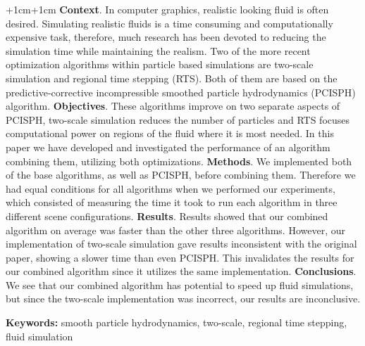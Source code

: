 \documentclass[a4paper,oneside]{bth}
\begin{document}
\abstract
\begin{changemargin}{+1cm}{+1cm}
\noindent
\textbf{Context}. In computer graphics, realistic looking fluid is often desired. Simulating realistic fluids is a time consuming and computationally expensive task, therefore, much research has been devoted to reducing the simulation time while maintaining the realism. Two of the more recent optimization algorithms within particle based simulations are two-scale simulation and regional time stepping (RTS). Both of them are based on the predictive-corrective incompressible smoothed particle hydrodynamics (PCISPH) algorithm. \newline
\textbf{Objectives}. These algorithms improve on two separate aspects of PCISPH, two-scale simulation reduces the number of particles and RTS focuses computational power on regions of the fluid where it is most needed. In this paper we have developed and investigated the performance of an algorithm combining them, utilizing both optimizations. \newline
\textbf{Methods}. We implemented both of the base algorithms, as well as PCISPH, before combining them. Therefore we had equal conditions for all algorithms when we performed our experiments, which consisted of measuring the time it took to run each algorithm in three different scene configurations.  \newline
\textbf{Results}. Results showed that our combined algorithm on average was faster than the other three algorithms. However, our implementation of two-scale simulation gave results inconsistent with the original paper, showing a slower time than even PCISPH. This invalidates the results for our combined algorithm since it utilizes the same implementation. \newline
\textbf{Conclusions}. We see that our combined algorithm has potential to speed up fluid simulations, but since the two-scale implementation was incorrect, our results are inconclusive. 


\par\vspace {1cm}
\noindent
\textbf{Keywords:} smooth particle hydrodynamics, two-scale, regional time stepping, fluid simulation 

\end{changemargin}

\listoffigures %
\listoftables %
\listofalgorithms %
\tableofcontents 
\end{document}
